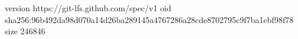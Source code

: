 version https://git-lfs.github.com/spec/v1
oid sha256:96b492da98d070a14d26ba289145a4767286a28cde8702795c9f7ba1ebf98f78
size 246846
